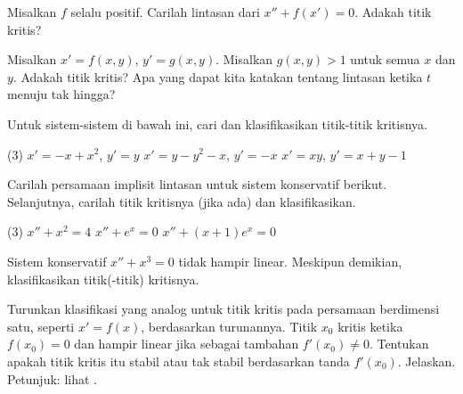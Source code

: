 \begin{exercise}
Misalkan $f$ selalu positif.
Carilah lintasan dari $x''+f(x') = 0$.
Adakah titik kritis?
\end{exercise}

\begin{exercise}
Misalkan $x' = f(x,y)$, $y' = g(x,y)$. Misalkan $g(x,y) > 1$ untuk
semua $x$ dan $y$. Adakah titik kritis? Apa yang dapat kita katakan tentang
lintasan ketika $t$ menuju tak hingga?
\end{exercise}

\setcounter{exercise}{100}

\begin{exercise}
Untuk sistem-sistem di bawah ini, cari dan klasifikasikan titik-titik kritisnya.
\begin{tasks}(3)
\task $x'=-x+x^2$, $y'=y$
\task $x'=y-y^2-x$, $y'=-x$
\task $x'=xy$, $y'=x+y-1$
\end{tasks}
\end{exercise}

\begin{exercise}
Carilah persamaan implisit lintasan untuk sistem konservatif
berikut. Selanjutnya, carilah titik kritisnya (jika ada) dan klasifikasikan.
\begin{tasks}(3)
\task $x''+ x^2 = 4$
\task $x''+ e^x = 0$
\task $x''+ (x+1)e^x = 0$
\end{tasks}
\end{exercise}

\begin{exercise}
Sistem konservatif $x''+x^3 = 0$ tidak hampir linear. Meskipun demikian,
klasifikasikan titik(-titik) kritisnya.
\end{exercise}

\begin{exercise}
Turunkan klasifikasi yang analog untuk titik kritis pada persamaan berdimensi satu,
seperti $x'= f(x)$, berdasarkan turunannya. Titik $x_0$ kritis ketika $f(x_0) = 0$ dan
hampir linear jika sebagai tambahan $f'(x_0) \neq 0$. Tentukan apakah titik kritis itu stabil atau tak stabil
berdasarkan tanda $f'(x_0)$. Jelaskan. Petunjuk: lihat .
\end{exercise}

